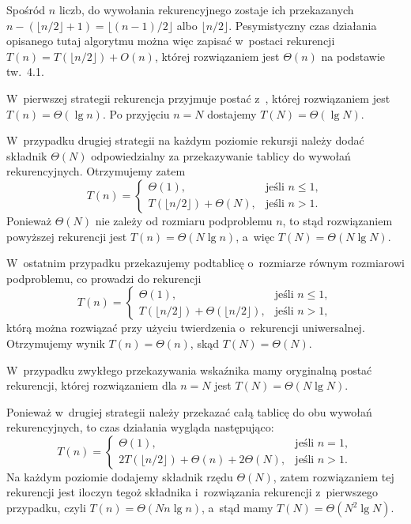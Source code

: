 Spośród $n$ liczb, do wywołania rekurencyjnego zostaje ich przekazanych $n-(\lfloor n/2\rfloor+1)=\lfloor(n-1)/2\rfloor$ albo $\lfloor n/2\rfloor$.
Pesymistyczny czas działania opisanego tutaj algorytmu można więc zapisać w~postaci rekurencji $T(n)=T(\lfloor n/2\rfloor)+O(n)$, której rozwiązaniem jest $\Theta(n)$ na podstawie tw.\ 4.1.


\subproblem %
W~pierwszej strategii rekurencja przyjmuje postać z~, której rozwiązaniem jest $T(n)=\Theta(\lg n)$.
Po przyjęciu $n=N$ dostajemy $T(N)=\Theta(\lg N)$.

W~przypadku drugiej strategii na każdym poziomie rekursji należy dodać składnik $\Theta(N)$ odpowiedzialny za przekazywanie tablicy do wywołań rekurencyjnych.
Otrzymujemy zatem
\[
	T(n) = \begin{cases}
		\Theta(1), & \text{jeśli $n\le1$}, \\
		T(\lfloor n/2\rfloor)+\Theta(N), & \text{jeśli $n>1$}.
	\end{cases}
\]
Ponieważ $\Theta(N)$ nie zależy od rozmiaru podproblemu $n$, to stąd rozwiązaniem powyższej rekurencji jest $T(n)=\Theta(N\lg n)$, a~więc $T(N)=\Theta(N\lg N)$.

W~ostatnim przypadku przekazujemy podtablicę o~rozmiarze równym rozmiarowi podproblemu, co prowadzi do rekurencji
\[
	T(n) = \begin{cases}
		\Theta(1), & \text{jeśli $n\le1$}, \\
		T(\lfloor n/2\rfloor)+\Theta(\lfloor n/2\rfloor), & \text{jeśli $n>1$},
	\end{cases}
\]
którą można rozwiązać przy użyciu twierdzenia o~rekurencji uniwersalnej.
Otrzymujemy wynik $T(n)=\Theta(n)$, skąd $T(N)=\Theta(N)$.

\subproblem %
W~przypadku zwykłego przekazywania wskaźnika mamy oryginalną postać rekurencji, której rozwiązaniem dla $n=N$ jest $T(N)=\Theta(N\lg N)$.

Ponieważ w~drugiej strategii należy przekazać całą tablicę do obu wywołań rekurencyjnych, to czas działania wygląda następująco:
\[
	T(n) = \begin{cases}
		\Theta(1), & \text{jeśli $n=1$}, \\
		2T(\lfloor n/2\rfloor)+\Theta(n)+2\Theta(N), & \text{jeśli $n>1$}.
	\end{cases}
\]
Na każdym poziomie dodajemy składnik rzędu $\Theta(N)$, zatem rozwiązaniem tej rekurencji jest iloczyn tegoż składnika i~rozwiązania rekurencji z~pierwszego przypadku, czyli $T(n)=\Theta(Nn\lg n)$, a~stąd mamy $T(N)=\Theta(N^2\lg N)$.

